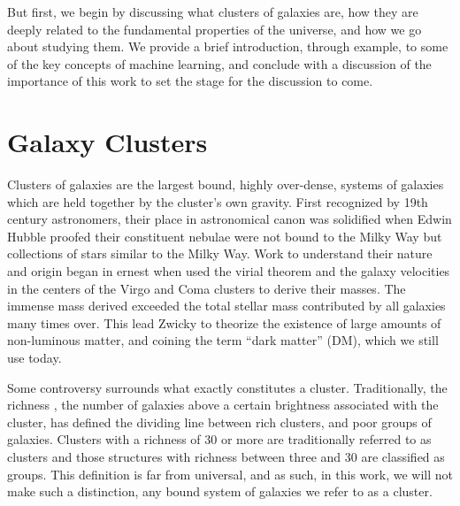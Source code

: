 But first, we begin by discussing what clusters of galaxies are, how they are deeply related to the fundamental properties of the universe, and how we go about studying them. We provide a brief introduction, through example, to some of the key concepts of machine learning, and conclude with a discussion of the importance of this work to set the stage for the discussion to come.

\section{Galaxy Clusters}
Clusters of galaxies are the largest bound, highly over-dense, systems of galaxies which are held together by the cluster's own gravity. First recognized by 19th century astronomers, their place in astronomical canon was solidified when Edwin Hubble proofed their constituent nebulae were not bound to the Milky Way \citep{Hubble1926} but collections of stars similar to the Milky Way. Work to understand their nature and origin began in ernest when \cite{Hubble1931} used the virial theorem and the galaxy velocities in the centers of the Virgo \citep{Smith1936} and Coma \citep{Zwicky1933} clusters to derive their masses. The immense mass derived exceeded the total stellar mass contributed by all galaxies many times over. This lead Zwicky to theorize the existence of large amounts of non-luminous matter, and coining the term ``dark matter'' (DM), which we still use today.  

Some controversy surrounds what exactly constitutes a cluster. Traditionally, the richness \citep{Abell1958}, the number of galaxies above a certain brightness associated with the cluster, has defined the dividing line between rich clusters, and poor groups of galaxies. Clusters with a richness of 30 or more are traditionally referred to as clusters and those structures with richness between three and 30 are classified as groups. This definition is far from universal, and as such, in this work, we will not make such a distinction, any bound system of galaxies we refer to as a cluster.

